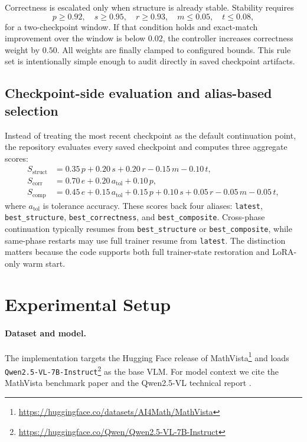 \documentclass{article} %
\begin{document}
Correctness is escalated only when structure is already stable. Stability requires
\begin{equation}
p \ge 0.92,\quad s \ge 0.95,\quad r \ge 0.93,\quad m \le 0.05,\quad t \le 0.08,
\end{equation}
for a two-checkpoint window. If that condition holds and exact-match improvement over the window is below $0.02$, the controller increases correctness weight by $0.50$. All weights are finally clamped to configured bounds. This rule set is intentionally simple enough to audit directly in saved checkpoint artifacts.

\subsection{Checkpoint-side evaluation and alias-based selection}

Instead of treating the most recent checkpoint as the default continuation point, the repository evaluates every saved checkpoint and computes three aggregate scores:
\begin{align}
S_{\text{struct}} &= 0.35\,p + 0.20\,s + 0.20\,r - 0.15\,m - 0.10\,t, \\
S_{\text{corr}} &= 0.70\,e + 0.20\,a_{\text{tol}} + 0.10\,p, \\
S_{\text{comp}} &= 0.45\,e + 0.15\,a_{\text{tol}} + 0.15\,p + 0.10\,s + 0.05\,r - 0.05\,m - 0.05\,t,
\end{align}
where $a_{\text{tol}}$ is tolerance accuracy. These scores back four aliases: \texttt{latest}, \texttt{best\_structure}, \texttt{best\_correctness}, and \texttt{best\_composite}. Cross-phase continuation typically resumes from \texttt{best\_structure} or \texttt{best\_composite}, while same-phase restarts may use full trainer resume from \texttt{latest}. The distinction matters because the code supports both full trainer-state restoration and LoRA-only warm start.

\section{Experimental Setup}

\paragraph{Dataset and model.}
The implementation targets the Hugging Face release of MathVista\footnote{\url{https://huggingface.co/datasets/AI4Math/MathVista}} and loads \texttt{Qwen2.5-VL-7B-Instruct}\footnote{\url{https://huggingface.co/Qwen/Qwen2.5-VL-7B-Instruct}} as the base VLM. For model context we cite the MathVista benchmark paper \citep{lu2024mathvista} and the Qwen2.5-VL technical report \citep{bai2025qwen25vl}.
\end{document}
